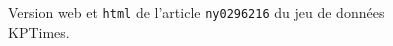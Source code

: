 \begin{figure}[!htbp]
    

    \caption{Version web et \texttt{html} de l'article \texttt{ny0296216} du jeu de données KPTimes.}
    \label{fig:kptimes_ex_img}
\end{figure}